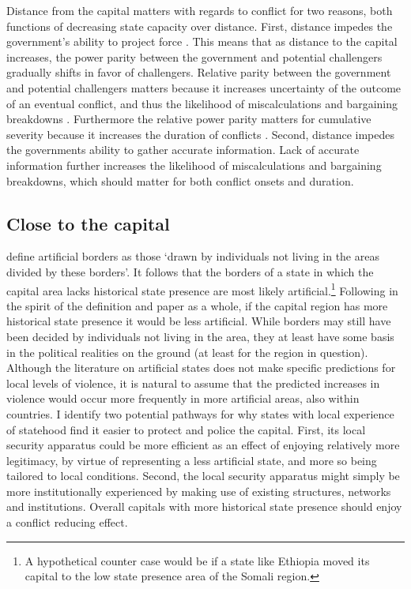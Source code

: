 Distance from the capital matters with regards to conflict for two reasons, both
functions of decreasing state capacity over distance. First, distance impedes
the government's ability to project force \citep{Boulding1963, Buhaug_2010,
Buhaug2009, Herbst2014}. This means that as distance to the capital increases,
the power parity between the government and potential challengers gradually
shifts in favor of challengers. Relative parity between the government and
potential challengers matters because it increases uncertainty of the outcome of
an eventual conflict, and thus the likelihood of miscalculations and bargaining
breakdowns \citep{Boulding1963, Buhaug_2010}. Furthermore the relative power
parity matters for cumulative severity because it increases the duration of
conflicts \citep{Buhaug2009}. Second, distance impedes the governments ability
to gather accurate information. Lack of accurate information further increases
the likelihood of miscalculations and bargaining breakdowns, which should matter
for both conflict onsets and duration.

\subsection{Close to the capital} \label{Close}

\citet{Alesina2011} define artificial borders as those `drawn by individuals
not living in the areas divided by these borders'. It follows that the borders of
a state in which the capital area lacks historical state presence are most
likely artificial.\footnote{A hypothetical counter case would be if a state like
Ethiopia moved its capital to the low state presence area of the Somali region.}
Following in the spirit of the definition and paper as a whole, if the capital
region has more historical state presence it would be less artificial. While
borders may still have been decided by individuals not living in the area, they
at least have some basis in the political realities on the ground (at least for
the region in question). Although the literature on artificial states does not
make specific predictions for local levels of violence, it is natural to assume
that the predicted increases in violence would occur more frequently in more
artificial areas, also within countries. I identify two potential pathways for
why states with local experience of statehood find it easier to protect and
police the capital. First, its local security apparatus could be more efficient
as an effect of enjoying relatively more legitimacy, by virtue of representing a
less artificial state, and more so being tailored to local conditions. Second,
the local security apparatus might simply be more institutionally experienced by
making use of existing structures, networks and institutions. Overall capitals
with more historical state presence should enjoy a conflict reducing effect.


